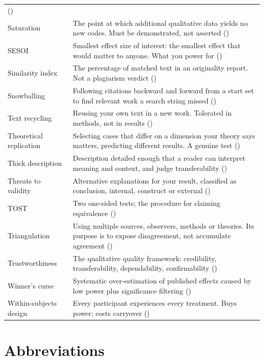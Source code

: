 \begin{center}
\begin{longtable}{@{}L{3.6cm}L{10.5cm}@{}}
  () \\
Saturation & The point at which additional qualitative data yields no new
  codes. Must be demonstrated, not asserted () \\
SESOI & Smallest effect size of interest: the smallest effect that would matter
  to anyone. What you power for () \\
Similarity index & The percentage of matched text in an originality report. Not
  a plagiarism verdict () \\
Snowballing & Following citations backward and forward from a start set to find
  relevant work a search string missed () \\
Text recycling & Reusing your own text in a new work. Tolerated in methods,
  not in results () \\
Theoretical replication & Selecting cases that differ on a dimension your
  theory says matters, predicting different results. A genuine test
  () \\
Thick description & Description detailed enough that a reader can interpret
  meaning and context, and judge transferability () \\
Threats to validity & Alternative explanations for your result, classified as
  conclusion, internal, construct or external () \\
TOST & Two one-sided tests; the procedure for claiming equivalence
  () \\
Triangulation & Using multiple sources, observers, methods or theories. Its
  purpose is to expose disagreement, not accumulate agreement
  () \\
Trustworthiness & The qualitative quality framework: credibility,
  transferability, dependability, confirmability () \\
Winner's curse & Systematic over-estimation of published effects caused by low
  power plus significance filtering () \\
Within-subjects design & Every participant experiences every treatment. Buys
  power; costs carryover () \\
\end{longtable}
\end{center}

\section{Abbreviations}

